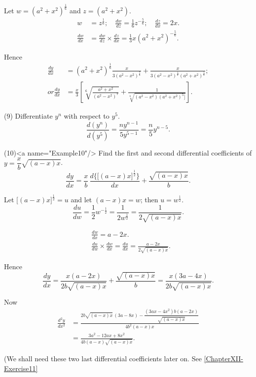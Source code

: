 \documentclass{ximera}
\begin{document}
Let $w = (a^2 + x^2)^{\frac{1}{6}}$ and $z = (a^2 + x^2)$.
\begin{align*}
w &= z^{\frac{1}{6}};\quad
  \frac{dw}{dz} = \frac{1}{6}z^{-\frac{5}{6}};\quad
  \frac{dz}{dx} = 2x. \\
\frac{dw}{dx} &= \frac{dw}{dz} \times \frac{dz}{dx} = \frac{1}{3} x(a^2 + x^2)^{-\frac{5}{6}}.
\end{align*}

Hence
\begin{align*}
\frac{dy}{dx}
  &= (a^2+x^2)^{\frac{1}{6}} \frac{x}{3(a^2-x^2)^{\frac{7}{6}}}
   + \frac{x}{3(a^2-x^2)^{\frac{1}{6}} (a^2+x^2)^{\frac{5}{6}}}; \\
 or
\frac{dy}{dx}
  &= \frac{x}{3}
     \left[\sqrt[6]{\frac{a^2+x^2}{(a^2-x^2)^7}}
           + \frac{1}{\sqrt[6]{(a^2-x^2)(a^2+x^2)^5]}} \right].
\end{align*}

(9) Differentiate $y^n$ with respect to $y^5$.
\[
\frac{d(y^n)}{d(y^5)} = \frac{ny^{n-1}}{5y^{5-1}} = \frac{n}{5} y^{n-5}.
\]


(10)<a name="Example10"/> Find the first and second differential coefficients
of $y = \dfrac{x}{b} \sqrt{(a-x)x}$.
\[
\frac{dy}{dx}
  = \frac{x}{b}\,
    \frac{d\bigl\{\bigl[(a-x)x\bigr]^{\frac{1}{2}}\bigr\}}{dx}
  + \frac{\sqrt{(a-x)x}}{b}.
\]

Let $\bigl[(a-x)x\bigr]^{\frac{1}{2}} = u$ and let $(a-x)x = w$; then $u = w^{\frac{1}{2}}$.
\[
\frac{du}{dw}
  = \frac{1}{2} w^{-\frac{1}{2}}
  = \frac{1}{2w^{\frac{1}{2}}} = \frac{1}{2\sqrt{(a-x)x}}.
\]

\begin{align*}
&\frac{dw}{dx} = a-2x.\\
&\frac{du}{dw} \times \frac{dw}{dx} = \frac{du}{dx} = \frac{a-2x}{2\sqrt{(a-x)x}}.
\end{align*}

Hence
\[
\frac{dy}{dx}
  = \frac{x(a-2x)}{2b\sqrt{(a-x)x}} + \frac{\sqrt{(a-x)x}}{b}
  = \frac{x(3a-4x)}{2b\sqrt{(a-x)x}}.
\]

Now
\begin{align*}
\frac{d^2y}{dx^2}
  &= \frac{2b \sqrt{(a-x)x}\, (3a-8x)
           - \dfrac{(3ax-4x^2)b(a-2x)}{\sqrt{(a-x)x}}}
          {4b^2(a-x)x} \\
  &= \frac{3a^2-12ax+8x^2}{4b(a-x)\sqrt{(a-x)x}}.
\end{align*}

(We shall need these two last differential coefficients
later on. See \ref{ChapterXII-Exercise11}
\end{document}
